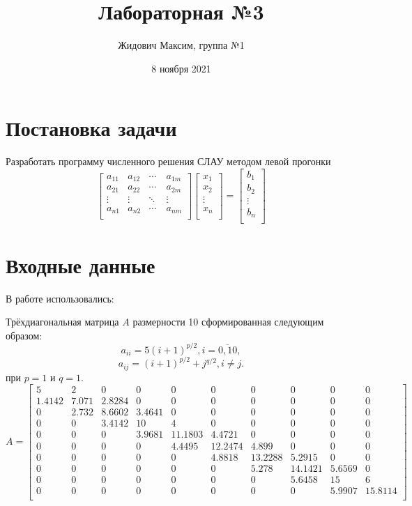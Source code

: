 \documentclass[12pt]{report}
\title{\vspace{-3cm}Лабораторная №3}
\author{Жидович Максим, группа №1}
\date{8 ноября 2021}
\begin{document}
\maketitle

\section{Постановка задачи}

Разработать программу численного решения СЛАУ методом левой прогонки
\[
\begin{bmatrix}
a_{11} & a_{12}  & \cdots   & a_{1m}   \\
a_{21} & a_{22}  & \cdots   & a_{2m}  \\
\vdots & \vdots  & \ddots   & \vdots  \\
a_{n1} & a_{n2}  & \cdots\  & a_{nm}  \\
\end{bmatrix}
\begin{bmatrix}
x_{1} \\
x_{2} \\
\vdots \\
x_{n} \\
\end{bmatrix}
=
\begin{bmatrix}
b_{1} \\
b_{2} \\
\vdots \\
b_{n} \\
\end{bmatrix}
\]

\section{Входные данные}

В работе использовались:

Трёхдиагональная матрица $A$ размерности 10 сформированная следующим образом:
\[
a_{ii} = 5(i+1)^{p/2}, i = \overline{0,10},
\]
\[
a_{ij} = (i + 1)^{p/2} + j^{q/2},  i \neq j.
\]
при $p = 1$ и $q = 1$.
\[A = 
\begin{bmatrix}
    5 & 2 & 0 & 0 & 0 & 0 & 0 & 0 & 0 & 0 \\
    1.4142 & 7.071 & 2.8284 & 0 & 0 & 0 & 0 & 0 & 0 & 0 \\
    0 & 2.732 & 8.6602 & 3.4641 & 0 & 0 & 0 & 0 & 0 & 0 \\
    0 & 0 & 3.4142 & 10 & 4 & 0 & 0 & 0 & 0 & 0 \\
    0 & 0 & 0 & 3.9681 & 11.1803 & 4.4721 & 0 & 0 & 0 & 0 \\
    0 & 0 & 0 & 0 & 4.4495 & 12.2474 & 4.899 & 0 & 0 & 0 \\
    0 & 0 & 0 & 0 & 0 & 4.8818 & 13.2288 & 5.2915 & 0 & 0 \\
    0 & 0 & 0 & 0 & 0 & 0 & 5.278 & 14.1421 & 5.6569 & 0 \\
    0 & 0 & 0 & 0 & 0 & 0 & 0 & 5.6458 & 15 & 6 \\
    0 & 0 & 0 & 0 & 0 & 0 & 0 & 0 & 5.9907 & 15.8114 \\
\end{bmatrix}
\]
\end{document}

